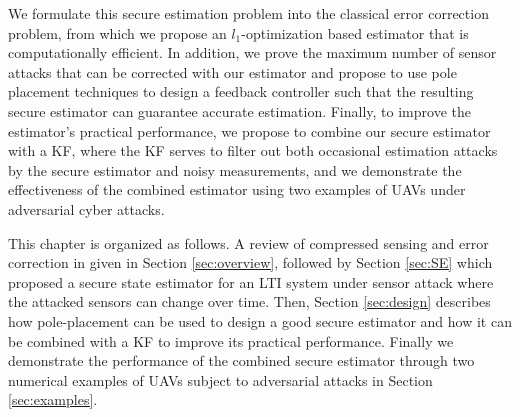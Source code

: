 \documentclass[../../thesis.tex]{subfiles}
\begin{document}
We formulate this secure estimation problem into the classical error correction problem, from which we propose an $l_1$-optimization based estimator that is computationally efficient.
In addition, we prove the maximum number of sensor attacks that can be corrected with our estimator and propose to use pole placement techniques to design a feedback controller such that the resulting secure estimator can guarantee accurate estimation.
Finally, to improve the estimator's practical performance, we propose to combine our secure estimator with a KF, where the KF serves to filter out both occasional estimation attacks by the secure estimator and noisy measurements, and we demonstrate the effectiveness of the combined estimator using two examples of UAVs under adversarial cyber attacks.





This chapter is organized as follows. A review of compressed sensing and error correction in given in Section \ref{sec:overview}, followed by Section \ref{sec:SE} which proposed a secure state estimator for an LTI system under sensor attack where the attacked sensors can change over time. 
Then, Section \ref{sec:design} describes how pole-placement can be used to design a good secure estimator and how it can be combined with a KF to improve its practical performance. 
Finally we demonstrate the performance of the combined secure estimator through two numerical examples of UAVs subject to adversarial attacks in Section \ref{sec:examples}. 
\end{document}
